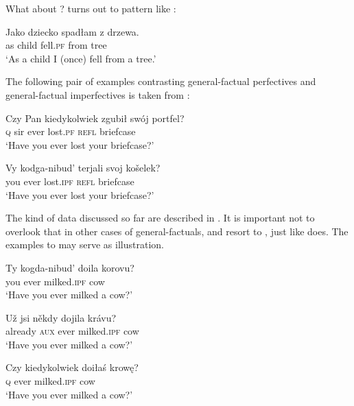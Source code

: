 \documentclass[output=paper,modfonts,newtxmath,hidelinks]{langscibook}
\begin{document}
\noindent What about ?  turns out to pattern like :

\ea \label{13:drzewa}
\gll Jako dziecko spad\l{a}m z drzewa. \\
as child fell.\textsc{pf} from tree\\
\glt `As a child I (once) fell from a tree.' 
\z

\noindent The following pair of examples contrasting  general-factual perfectives  and  general-factual imperfectives  is taken from \citet{Wiemer01}:

\ea \label{13:portfel}
\gll Czy Pan kiedykolwiek zgubił swój portfel? \\
\textsc{q} sir ever lost.\textsc{pf} \textsc{refl} briefcase\\
\glt `Have you ever lost your briefcase?' 
\z

\ea \label{13:koselek}
\gll Vy kodga-nibud' terjali svoj košelek? \\
you ever lost.\textsc{ipf} \textsc{refl} briefcase \\
\glt `Have you ever lost your briefcase?'
\z


\noindent The kind of data discussed so far are described in \citet[95ff.]{Dickey2000}. 
It is important not to overlook that in other cases of general-factuals, 
 and  resort to , just like  does. The examples  to  may serve as illustration.   

\begin{exe}
\ex\label{13:korovu}
\gll Ty kogda-nibud' doila korovu? \\
you ever milked.\textsc{ipf} cow\\
\glt `Have you ever milked a cow?' 
\end{exe}
\begin{exe}
\ex\label{13:kravu}
\gll U\v{z} jsi n\v{e}kdy dojila kr\'avu? \\
already \textsc{aux} ever milked.\textsc{ipf} cow \\
\glt `Have you ever milked a cow?'
\end{exe}
\begin{exe}
\ex\label{13:krowe}
\gll Czy kiedykolwiek doi\l{a}\'s krow\k e? \\
\textsc{q} ever milked.\textsc{ipf} cow\\
\glt `Have you ever milked a cow?'
\end{exe}
\end{document}
